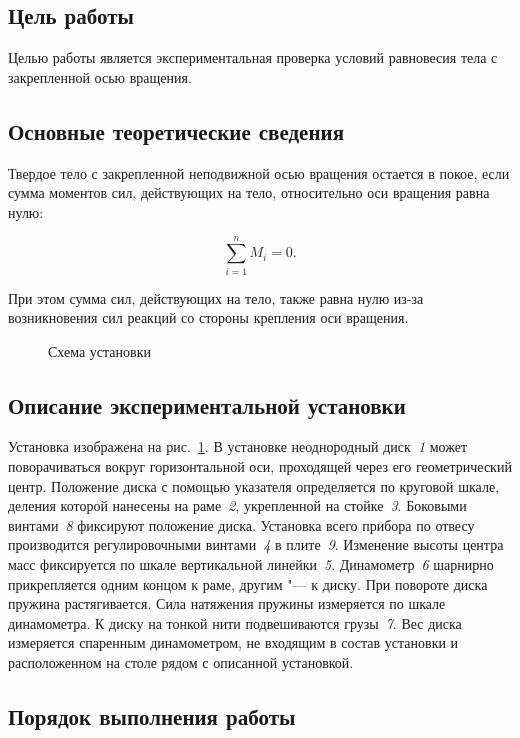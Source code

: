 \documentclass[a4paper, 12pt]{extarticle}
\newcommand{\isum}{\sum\limits_{i=1}^{n}}
\begin{document}
\MTDTitlePage
\MTDInfoPage

\setcounter{section}{6}

\subsection{Цель работы}
Целью работы является экспериментальная проверка условий равновесия тела с закрепленной осью вращения.

\subsection{Основные теоретические сведения}
Твердое тело с закрепленной неподвижной осью вращения остается в  покое, если сумма моментов сил, действующих на тело, относительно оси вращения равна нулю:

\[
\isum M_i = 0. %
\]

При этом сумма сил, действующих на тело, также равна нулю из-за возникновения сил реакций со стороны крепления оси вращения.

\begin{figure}
\caption{Схема установки \label{fig:m6-disk-device}}
\end{figure}



\subsection{Описание экспериментальной установки}

Установка изображена на рис.~\ref{fig:m6-disk-device}. В установке неоднородный диск~\emph{1} может поворачиваться вокруг горизонтальной оси, проходящей через его геометрический центр. Положение диска с помощью указателя определяется по круговой шкале, деления которой нанесены на раме~\emph{2}, укрепленной на стойке~\emph{3}. Боковыми винтами~\emph{8} фиксируют положение диска.  Установка всего прибора по отвесу производится регулировочными винтами~\emph{4} в плите~\emph{9}. Изменение высоты центра масс фиксируется по шкале вертикальной линейки~\emph{5}. Динамометр~\emph{6} шарнирно прикрепляется одним концом к раме, другим "--- к диску. При повороте диска пружина растягивается. Сила натяжения пружины измеряется по шкале динамометра. К диску на тонкой нити подвешиваются грузы~\emph{7}. Вес диска измеряется спаренным динамометром, не входящим в состав установки и расположенном на столе рядом с описанной  установкой.


\subsection{Порядок выполнения работы}
\end{document}
